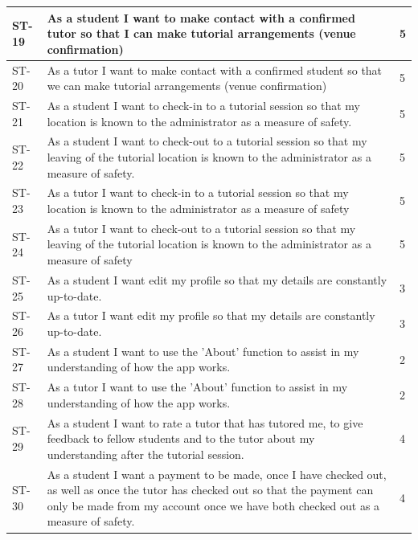 \documentclass[12pt]{article}
\begin{document}
{{\begin{longtable}{| l | p{10cm}| l |}
			\\ \hline ST-19 & As a student I want to make contact with a confirmed tutor so that I can make tutorial arrangements (venue confirmation) &5

			\\ \hline ST-20 &As a tutor I want to make contact with a confirmed student so that we can make tutorial arrangements (venue confirmation)  &5

			\\ \hline ST-21 & As a student I want to check-in to a tutorial session so that my location is known to the administrator as a measure of safety.  &5

			\\ \hline ST-22 & As a student I want to check-out to a tutorial session so that my leaving of the tutorial location is known to the administrator as a measure of safety.   &5

			\\ \hline ST-23 & As a tutor I want to check-in to a tutorial session so that my location is known to the administrator as a measure of safety  &5

			\\ \hline ST-24 & As a tutor I want to check-out to a tutorial session so that my leaving of the tutorial location is known to the administrator as a measure of safety  &5


			\\ \hline ST-25 & As a student I want edit my profile so that my details are constantly up-to-date.  	 &3


			\\ \hline ST-26 & As a tutor I want edit my profile so that my details are constantly up-to-date.  &3

			\\ \hline ST-27 & As a student I want to use the 'About' function to assist in my understanding of how the app works.  &2

			\\ \hline ST-28 & As a tutor I want to use the 'About' function to assist in my understanding of how the app works.   &2

			\\ \hline ST-29 & As a student I want to rate a tutor that has tutored me, to give feedback to fellow students and to the tutor about my understanding after the tutorial session. &4

			\\ \hline ST-30 & As a student I want a payment to be made, once I have checked out, as well as once the tutor has checked out so that the payment can only be made from my account once we have both checked out as a measure of safety.  &4 \\ \hline
\end{longtable}
}


}
\end{document}
